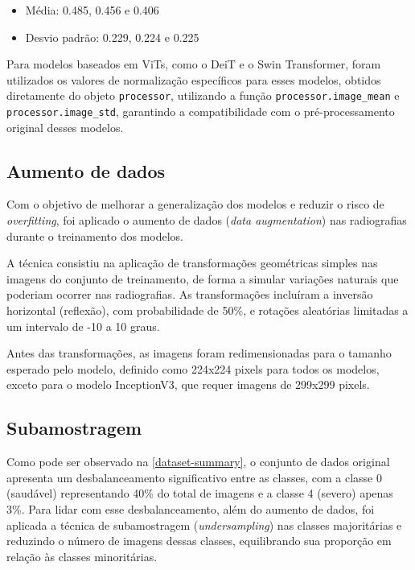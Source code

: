 \begin{itemize}
    \item Média: 0.485, 0.456 e 0.406
    \item Desvio padrão: 0.229, 0.224 e 0.225
\end{itemize}

Para modelos baseados em ViTs, como o DeiT e o Swin Transformer, foram utilizados os valores de normalização específicos para esses modelos, obtidos diretamente do objeto \texttt{processor}, utilizando a função \texttt{processor.image\_mean} e \texttt{processor.image\_std}, garantindo a compatibilidade com o pré-processamento original desses modelos.

\subsection{Aumento de dados}

Com o objetivo de melhorar a generalização dos modelos e reduzir o risco de \textit{overfitting}, foi aplicado o aumento de dados (\textit{data augmentation}) nas radiografias durante o treinamento dos modelos.

A técnica consistiu na aplicação de transformações geométricas simples nas imagens do conjunto de treinamento, de forma a simular variações naturais que poderiam ocorrer nas radiografias. As transformações incluíram a inversão horizontal (reflexão), com probabilidade de 50\%, e rotações aleatórias limitadas a um intervalo de -10 a 10 graus.

Antes das transformações, as imagens foram redimensionadas para o tamanho esperado pelo modelo, definido como 224x224 pixels para todos os modelos, exceto para o modelo InceptionV3, que requer imagens de 299x299 pixels.

\subsection{Subamostragem}

Como pode ser observado na \autoref{dataset-summary}, o conjunto de dados original apresenta um desbalanceamento significativo entre as classes, com a classe 0 (saudável) representando 40\% do total de imagens e a classe 4 (severo) apenas 3\%. Para lidar com esse desbalanceamento, além do aumento de dados, foi aplicada a técnica de subamostragem (\textit{undersampling}) nas classes majoritárias e reduzindo o número de imagens dessas classes, equilibrando sua proporção em relação às classes minoritárias.

